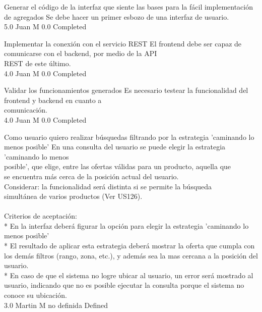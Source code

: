 		{Generar el código de la interfaz que siente las bases para la fácil implementación de agregados} %
		{Se debe hacer un primer esbozo de una interfaz de usuario.\\
} %
		{5.0} %
		{Juan M} %
		{0.0} %
		{Completed} %

		{Implementar la conexión con el servicio REST} %
		{El frontend debe ser capaz de comunicarse con el backend, por medio de la API\\
REST de este último.\\
} %
		{4.0} %
		{Juan M} %
		{0.0} %
		{Completed} %

		{Validar los funcionamientos generados} %
		{Es necesario testear la funcionalidad del frontend y backend en cuanto a\\
comunicación.\\
} %
		{4.0} %
		{Juan M} %
		{0.0} %
		{Completed} %


\vspace{20pt}

	{Como usuario quiero realizar búsquedas filtrando por la estrategia 'caminando lo menos posible'} %
	{En una consulta del usuario se puede elegir la estrategia 'caminando lo menos\\
posible', que elige, entre las ofertas válidas para un producto, aquella que\\
se encuentra más cerca de la posición actual del usuario.\\
Considerar: la funcionalidad será distinta si se permite la búsqueda\\
simultánea de varios productos (Ver US126).\\
  \\
Criterios de aceptación:\\
* En la interfaz deberá figurar la opción para elegir la estrategia 'caminando lo menos posible'\\
* El resultado de aplicar esta estrategia deberá mostrar la oferta que cumpla con los demás filtros (rango, zona, etc.), y además sea la mas cercana a la posición del usuario.\\
* En caso de que el sistema no logre ubicar al usuario, un error será mostrado al usuario, indicando que no es posible ejecutar la consulta porque el sistema no conoce su ubicación.\\
} %
	{} %
	{3.0} %
	{Martin M} %
	{no definida} %
	{Defined} %


